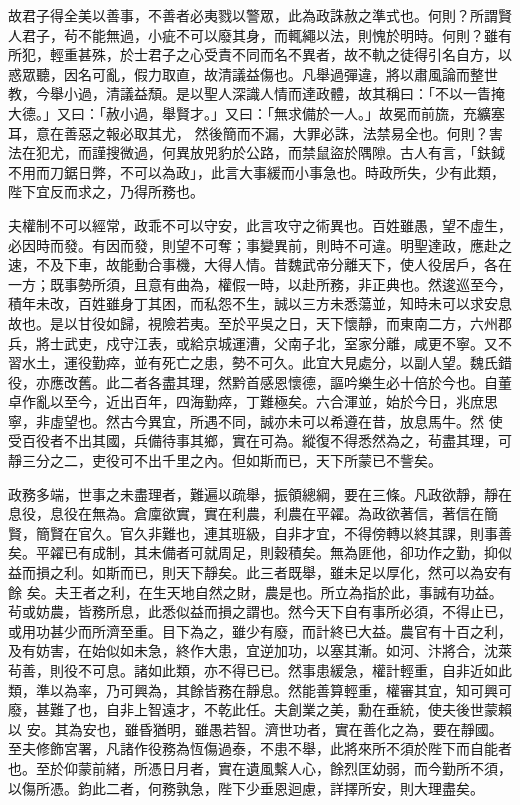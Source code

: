 \begin{pinyinscope}
 故君子得全美以善事，不善者必夷戮以警眾，此為政誅赦之準式也。何則？所謂賢人君子，茍不能無過，小疵不可以廢其身，而輒繩以法，則愧於明時。何則？雖有所犯，輕重甚殊，於士君子之心受責不同而名不異者，故不軌之徒得引名自方，以惑眾聽，因名可亂，假力取直，故清議益傷也。凡舉過彈違，將以肅風論而整世教，今舉小過，清議益頹。是以聖人深識人情而達政體，故其稱曰：「不以一眚掩大德。」又曰：「赦小過，舉賢才。」又曰：「無求備於一人。」故冕而前旒，充纊塞耳，意在善惡之報必取其尤，
 然後簡而不漏，大罪必誅，法禁易全也。何則？害法在犯尤，而謹搜微過，何異放兕豹於公路，而禁鼠盜於隅隙。古人有言，「鈇鉞不用而刀鋸日弊，不可以為政」，此言大事緩而小事急也。時政所失，少有此類，陛下宜反而求之，乃得所務也。



 夫權制不可以經常，政乖不可以守安，此言攻守之術異也。百姓雖愚，望不虛生，必因時而發。有因而發，則望不可奪；事變異前，則時不可違。明聖達政，應赴之速，不及下車，故能動合事機，大得人情。昔魏武帝分離天下，使人役居戶，各在一方；既事勢所須，且意有曲為，權假一時，以赴所務，非正典也。然逡巡至今，
 積年未改，百姓雖身丁其困，而私怨不生，誠以三方未悉蕩並，知時未可以求安息故也。是以甘役如歸，視險若夷。至於平吳之日，天下懷靜，而東南二方，六州郡兵，將士武吏，戍守江表，或給京城運漕，父南子北，室家分離，咸更不寧。又不習水土，運役勤瘁，並有死亡之患，勢不可久。此宜大見處分，以副人望。魏氏錯役，亦應改舊。此二者各盡其理，然黔首感恩懷德，謳吟樂生必十倍於今也。自董卓作亂以至今，近出百年，四海勤瘁，丁難極矣。六合渾並，始於今日，兆庶思寧，非虛望也。然古今異宜，所遇不同，誠亦未可以希遵在昔，放息馬牛。然
 使受百役者不出其國，兵備待事其鄉，實在可為。縱復不得悉然為之，茍盡其理，可靜三分之二，吏役可不出千里之內。但如斯而已，天下所蒙已不訾矣。



 政務多端，世事之未盡理者，難遍以疏舉，振領總綱，要在三條。凡政欲靜，靜在息役，息役在無為。倉廩欲實，實在利農，利農在平糴。為政欲著信，著信在簡賢，簡賢在官久。官久非難也，連其班級，自非才宜，不得傍轉以終其課，則事善矣。平糴已有成制，其未備者可就周足，則穀積矣。無為匪他，卻功作之勤，抑似益而損之利。如斯而已，則天下靜矣。此三者既舉，雖未足以厚化，然可以為安有餘
 矣。夫王者之利，在生天地自然之財，農是也。所立為指於此，事誠有功益。茍或妨農，皆務所息，此悉似益而損之謂也。然今天下自有事所必須，不得止已，或用功甚少而所濟至重。目下為之，雖少有廢，而計終已大益。農官有十百之利，及有妨害，在始似如未急，終作大患，宜逆加功，以塞其漸。如河、汴將合，沈萊茍善，則役不可息。諸如此類，亦不得已已。然事患緩急，權計輕重，自非近如此類，準以為率，乃可興為，其餘皆務在靜息。然能善算輕重，權審其宜，知可興可廢，甚難了也，自非上智遠才，不乾此任。夫創業之美，勳在垂統，使夫後世蒙賴以
 安。其為安也，雖昏猶明，雖愚若智。濟世功者，實在善化之為，要在靜國。至夫修飾宮署，凡諸作役務為恆傷過泰，不患不舉，此將來所不須於陛下而自能者也。至於仰蒙前緒，所憑日月者，實在遺風繫人心，餘烈匡幼弱，而今勤所不須，以傷所憑。鈞此二者，何務孰急，陛下少垂恩迴慮，詳擇所安，則大理盡矣。




\end{pinyinscope}
